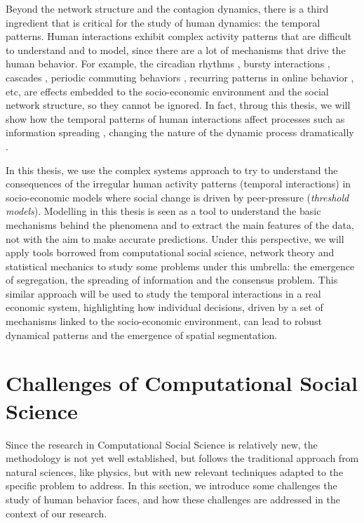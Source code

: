 Beyond the network structure and the contagion dynamics, there is a third ingredient that is critical for the study of human dynamics: the temporal patterns. Human interactions exhibit complex activity patterns that are difficult to understand and to model, since there are a lot of mechanisms that drive the human behavior. For example, the circadian rhythms \cite{roenneberg-2013}, bursty interactions \cite{Barabasi2005Bursts}, cascades \cite{watts-2002}, periodic commuting behaviors \cite{gonzalez2008understanding}, recurring patterns in online behavior \cite{Lazer2009CompSocSci}, etc, are effects embedded to the socio-economic environment and the social network structure, so they cannot be ignored. In fact, throug this thesis, we will show how the temporal patterns of human interactions affect processes such as information spreading  \cite{Holme2012Temporal}, changing the nature of the dynamic process dramatically \cite{karsai-2011}.

In this thesis, we use the complex systems approach to try to understand the consequences of the irregular human activity patterns (temporal interactions) in socio-economic models where social change is driven by peer-pressure (\textit{threshold models}). Modelling in this thesis is seen as a tool to understand the basic mechanisms behind the phenomena and to extract the main features of the data, not with the aim to make accurate predictions. Under this perspective, we will apply tools borrowed from computational social science, network theory and statistical mechanics to study some problems under this umbrella: the emergence of segregation, the spreading of information and the consensus problem. This similar approach will be used to study the temporal interactions in a real economic system, highlighting how individual decisions, driven by a set of mechanisms linked to the socio-economic environment, can lead to robust dynamical patterns and the emergence of spatial segmentation.

\section{\label{sec:Challenges of Computational Social Science} Challenges of Computational Social Science}

Since the research in Computational Social Science is relatively new, the methodology is not yet well established, but follows the traditional approach from natural sciences, like physics, but with new relevant techniques adapted to the specific problem to address. In this section, we introduce some challenges the study of human behavior faces, and how these challenges are addressed in the context of our research.

